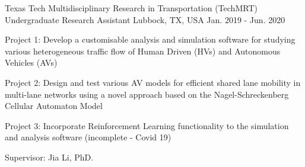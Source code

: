\begin{cventries}



    \cventry
    {Texas Tech Multidisciplinary Research in Transportation (TechMRT)}
    {Undergraduate Research Assistant}
    {Lubbock, TX, USA}
    {Jan. 2019 - Jun. 2020}
    {
        \begin{cvitems}
        \item{Project 1: Develop a customisable analysis and simulation software for studying various heterogeneous traffic flow of Human Driven (HVs) and Autonomous Vehicles (AVs)}
        \item{Project 2: Design and test various AV models for efficient shared lane mobility in multi-lane networks using a novel approach based on the Nagel-Schreckenberg Cellular Automaton Model}
        \item{Project 3: Incorporate Reinforcement Learning functionality to the simulation and analysis software (incomplete - Covid 19)}
        \item{Supervisor: Jia Li, PhD.}
        \end{cvitems}
        \vspace{1em}
    }


\end{cventries}
